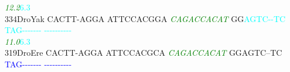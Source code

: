 \documentclass[11pt,twoside,reqno,a4paper]{article}
\begin{document}
{\hspace*{4\charwidth}\hspace*{7\charwidth}\hspace*{1\charwidth}\hspace*{1\charwidth}\hspace*{20\charwidth}\textit{\textcolor{green}{12.2}}\hspace*{1\charwidth}\hspace*{8\charwidth}\textcolor{cyan}{6.3}\hspace*{1\charwidth}\hspace*{1\charwidth}\hspace*{1\charwidth}\\
334\hspace*{1\charwidth}DroYak	CACTT-AGGA	ATTCCACGGA	\textit{\textcolor{green}{C}}\textit{\textcolor{green}{A}}\textit{\textcolor{green}{G}}\textit{\textcolor{green}{A}}\textit{\textcolor{green}{C}}\textit{\textcolor{green}{C}}\textit{\textcolor{green}{A}}\textit{\textcolor{green}{C}}\textit{\textcolor{green}{A}}\textit{\textcolor{green}{T}}	GG\textcolor{cyan}{A}\textcolor{cyan}{G}\textcolor{cyan}{T}\textcolor{cyan}{C}\textcolor{cyan}{-}\textcolor{cyan}{-}\textcolor{cyan}{T}\textcolor{cyan}{C}	\textcolor{cyan}{T}\textcolor{cyan}{A}\textcolor{cyan}{G}\textcolor{cyan}{-}\textcolor{cyan}{-}\textcolor{cyan}{-}\textcolor{cyan}{-}\textcolor{cyan}{-}\textcolor{cyan}{-}\textcolor{cyan}{-}	\textcolor{cyan}{-}\textcolor{cyan}{-}\textcolor{cyan}{-}\textcolor{cyan}{-}\textcolor{cyan}{-}\textcolor{cyan}{-}\textcolor{cyan}{-}\textcolor{cyan}{-}\textcolor{cyan}{-}\textcolor{cyan}{-}	\\
\hspace*{4\charwidth}\hspace*{7\charwidth}\hspace*{1\charwidth}\hspace*{1\charwidth}\hspace*{20\charwidth}\textit{\textcolor{green}{11.0}}\hspace*{1\charwidth}\hspace*{8\charwidth}\textcolor{cyan}{6.3}\hspace*{1\charwidth}\hspace*{1\charwidth}\hspace*{1\charwidth}\\
319\hspace*{1\charwidth}DroEre	CACTT-AGGA	ATTCCACGCA	\textit{\textcolor{green}{C}}\textit{\textcolor{green}{A}}\textit{\textcolor{green}{G}}\textit{\textcolor{green}{A}}\textit{\textcolor{green}{C}}\textit{\textcolor{green}{C}}\textit{\textcolor{green}{A}}\textit{\textcolor{green}{C}}\textit{\textcolor{green}{A}}\textit{\textcolor{green}{T}}	GGAGTC--TC	\textcolor{blue}{T}\textcolor{blue}{A}\textcolor{blue}{G}\textcolor{blue}{-}\textcolor{blue}{-}\textcolor{blue}{-}\textcolor{blue}{-}\textcolor{blue}{-}\textcolor{blue}{-}\textcolor{blue}{-}	\textcolor{blue}{-}\textcolor{blue}{-}\textcolor{blue}{-}\textcolor{blue}{-}\textcolor{blue}{-}\textcolor{blue}{-}\textcolor{blue}{-}\textcolor{blue}{-}\textcolor{blue}{-}\textcolor{blue}{-}	\\
}
\end{document}
